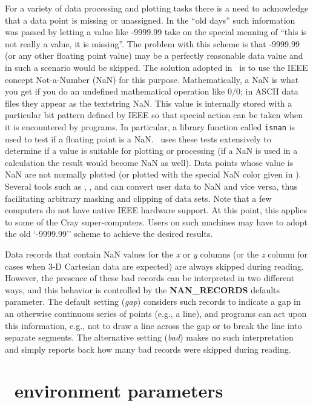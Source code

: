 For a variety of data processing and plotting tasks there is a need to acknowledge that
a data point is missing or unassigned.  In the ``old days'' such information was passed
by letting a value like -9999.99 take on the special meaning of ``this is not really a
value, it is missing''.  The problem with this scheme is that -9999.99 (or any other
floating point value) may be a perfectly reasonable data value and in such a scenario
would be skipped.  The solution adopted in \GMT\ is to use the IEEE concept Not-a-Number
(NaN) for this purpose.  Mathematically, a NaN is what you get if you do an undefined
mathematical operation like $0/0$; in ASCII data files they appear as the textstring NaN.
This value is internally stored with a particular bit pattern
defined by IEEE so that special action can be taken when it is encountered by programs.
In particular, a library function called \texttt{isnan} is used to test if a floating point
is a NaN.  \GMT\ uses these tests extensively to determine if a value is suitable for plotting
or processing (if a NaN is used in a calculation the result would become NaN as well).  Data points
whose value is NaN are not normally plotted (or plotted with the special NaN color given in
).  Several tools such as , , and
 can convert user data to NaN and vice versa, thus facilitating arbitrary
masking and clipping of data sets.  Note that a few computers do not have native IEEE hardware
support.  At this point, this applies to some of the Cray super-computers.  Users on such
machines may have to adopt the old `-9999.99'' scheme to achieve the desired results.

Data records that contain NaN values for the {\it x} or {\it y} columns (or the {\it z} column
for cases when 3-D Cartesian data are expected) are always skipped during reading.  However,
the presence of these bad records can be interpreted in two different ways, and this behavior
is controlled by the {\bf NAN\_RECORDS} defaults parameter.  The default setting (\emph{gap})
considers such records to indicate a gap in an otherwise continuous series of points (e.g., a line),
and programs can act upon this information, e.g., not to draw a line across the gap or to break the line
into separate segments.  The alternative setting (\emph{bad}) makes no such interpretation and
simply reports back how many bad records were skipped during reading.

\section{\gmt\ environment parameters}

